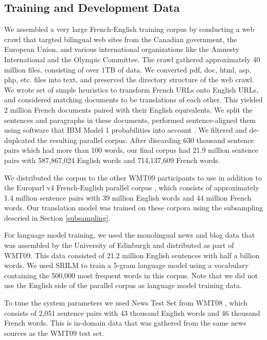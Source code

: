 \documentclass[11pt]{article}
\begin{document}
\subsection{Training and Development Data}

We assembled a very large French-English training corpus  \cite{billion-word-parallel-corpus} by conducting a web crawl that targted bilingual web sites from the Canadian government, the European Union, and various international organizations like the Amnesty International and the Olympic Committee.  The crawl gathered approximately 40 million files, consisting of over 1TB of data.  We converted pdf, doc, html, asp, php, etc. files into text, and preserved the directory structure of the web crawl.  We wrote set of simple heuristics to transform French URLs onto English URLs, and considered matching documents to be translations of each other.  This yielded 2 million French documents paired with their English equivalents.  We split the sentences and paragraphs in these documents, performed sentence-aligned them using software that IBM Model 1 probabilities into account \cite{Moore2002}.   We filtered and de-duplcated the resulting parallel corpus.  After discarding 630 thousand sentence pairs which had more than 100 words, our final corpus had 21.9 million sentence pairs with 587,867,024 English words and 714,137,609 French words.  

We distributed the corpus to the other WMT09 participants to use in addition to the Europarl v4 French-English parallel corpus \cite{Koehn-europarl}, which consists of approximately 1.4 million sentence pairs with 39 million English words and 44 million French words.  Our translation model was trained on these corpora using the subsampling descried in Section \ref{subsampling}.  

For language model training, we used the monolingual news and blog data that was assembled by the University of Edinburgh and distributed as part of WMT09.  This data consisted of 21.2 million English sentences with half a billion words.  We used SRILM to train a 5-gram language model using a vocabulary containing the 500,000 most frequent words in this corpus.  Note that we did not use the English side of the parallel corpus as language model training data.

To tune the system parameters we used News Test Set from WMT08 \cite{Callison-Burch2008a}, which consists of 2,051 sentence pairs with 43 thousand English words and 46 thousand French words.  This is in-domain data that was gathered from the same news sources as the WMT09 test set.
\end{document}
